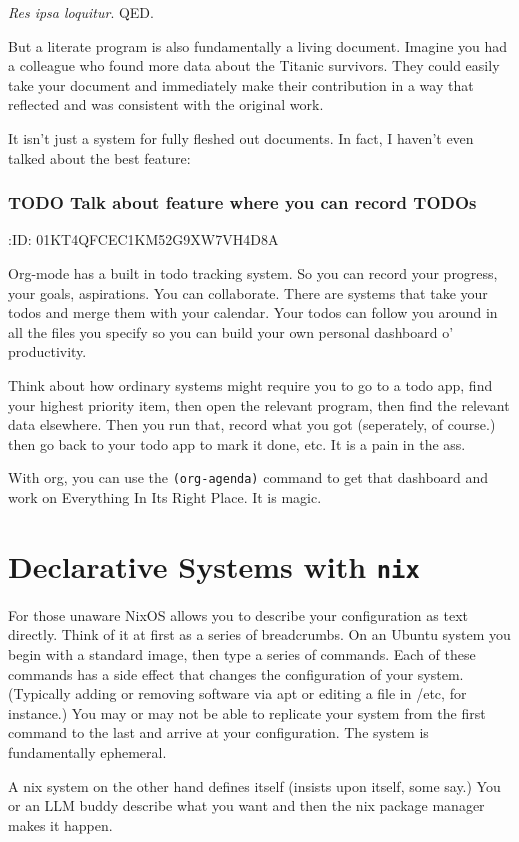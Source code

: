\documentclass[11pt]{article}
\begin{document}
\emph{Res ipsa loquitur}. QED.

But a literate program is also fundamentally a living document. Imagine you had a colleague who found more data about the Titanic survivors. They could easily take your document and immediately make their contribution in a way that reflected and was consistent with the original work. 

It isn't just a system for fully fleshed out documents. In fact, I haven't even talked about the best feature:
\subsubsection{{\bfseries\sffamily TODO} Talk about feature where you can record TODOs}
\label{sec:orgab75af0}


:ID:       01KT4QFCEC1KM52G9XW7VH4D8A

Org-mode has a built in todo tracking system. So you can record your progress, your goals, aspirations. You can collaborate. There are systems that take your todos and merge them with your calendar. Your todos can follow you around in all the files you specify so you can build your own personal dashboard o' productivity.

Think about how ordinary systems might require you to go to a todo app, find your highest priority item, then open the relevant program, then find the relevant data elsewhere. Then you run that, record what you got (seperately, of course.) then go back to your todo app to mark it done, etc. It is a pain in the ass.

With org, you can use the \texttt{(org-agenda)} command to get that dashboard and work on Everything In Its Right Place. It is magic. 
\section{Declarative Systems with \texttt{nix}}
\label{sec:orgb1f95c2}
For those unaware NixOS allows you to describe your configuration as text directly. Think of it at first as a series of breadcrumbs. On an Ubuntu system you begin with a standard image, then type a series of commands. Each of these commands has a side effect that changes the configuration of your system. (Typically adding or removing software via apt or editing a file in /etc, for instance.) You may or may not be able to replicate your system from the first command to the last and arrive at your configuration. The system is fundamentally ephemeral.

A nix system on the other hand defines itself (insists upon itself, some say.) You or an LLM buddy describe what you want and then the nix package manager makes it happen.
\end{document}
